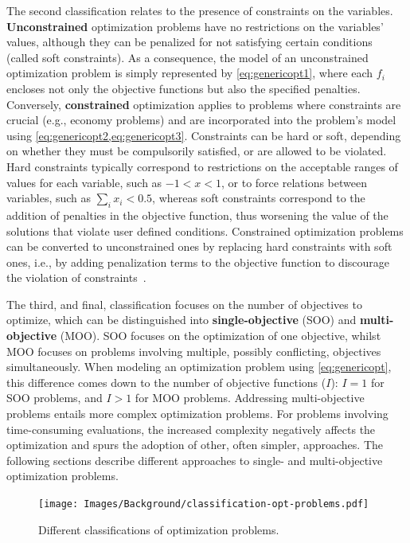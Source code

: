 	The second classification relates to the presence of constraints on the variables. \textbf{Unconstrained} optimization problems have no restrictions on the variables' values, although they can be penalized for not satisfying certain conditions (called soft constraints). As a consequence, the model of an unconstrained optimization problem is simply represented by \cref{eq:genericopt1}, where each $f_i$ encloses not only the objective functions but also the specified penalties. Conversely, \textbf{constrained} optimization applies to problems where constraints are crucial (e.g., economy problems) and are incorporated into the problem's model using \cref{eq:genericopt2,eq:genericopt3}. Constraints can be hard or soft, depending on whether they must be compulsorily satisfied, or are allowed to be violated. Hard constraints typically correspond to restrictions on the acceptable ranges of values for each variable, such as $-1<x<1$, or to force relations between variables, such as $\sum_{i} x_i<0.5$, whereas soft constraints correspond to the addition of penalties in the objective function, thus worsening the value of the solutions that violate user defined conditions. Constrained optimization problems can be converted to unconstrained ones by replacing hard constraints with soft ones, i.e., by adding penalization terms to the objective function to discourage the violation of constraints~\cite{Nocedal2011NumericalOptimization}. 
	
	The third, and final, classification focuses on the number of objectives to optimize, which can be distinguished into \textbf{single-objective} (\ac{SOO}) and \textbf{multi-objective} (\ac{MOO}). \ac{SOO} focuses on the optimization of one objective, whilst \ac{MOO} focuses on problems involving multiple, possibly conflicting, objectives simultaneously. When modeling an optimization problem using \cref{eq:genericopt}, this difference comes down to the number of objective functions ($I$): $I=1$ for \ac{SOO} problems, and $I>1$ for \ac{MOO} problems. Addressing multi-objective problems entails more complex optimization problems. For problems involving time-consuming evaluations, the increased complexity negatively affects the optimization and spurs the adoption of other, often simpler, approaches. The following sections describe different approaches to single- and multi-objective optimization problems. 
	
	\begin{figure}
		\centering
		\texttt{[image: Images/Background/classification-opt-problems.pdf]}
		\caption{Different classifications of optimization problems.}
		\label{fig:optclassification}
	\end{figure}
	
